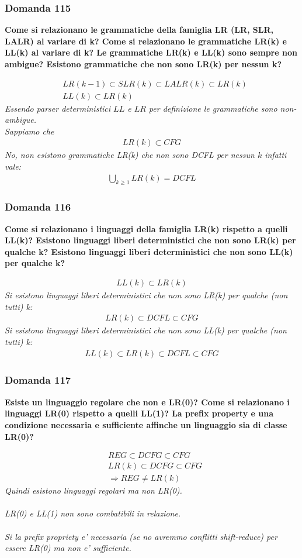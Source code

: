 \documentclass[12pt,a4paper,tikz,border=5pt]{article}
\newcommand{\domanda}[3]{%
  \subsubsection*{Domanda #1}
  \textbf{#2}
  \begin{mdframed}[backgroundcolor=grigiochiarissimo, linecolor=gray!50, linewidth=0.6pt, innertopmargin=6pt, innerbottommargin=12pt, innerleftmargin=8pt, innerrightmargin=8pt]
    \textit{#3}%
  \end{mdframed}%
  \vspace{0.4em}
}
\begin{document}
\domanda{115}{Come si relazionano le grammatiche della famiglia LR (LR, SLR, LALR) al variare di k? Come si relazionano le grammatiche LR(k) e LL(k) al variare di k? Le grammatiche LR(k) e LL(k) sono sempre non ambigue? Esistono grammatiche che non sono LR(k) per nessun k?}{
  \begin{align*}
    &LR(k-1) \subset SLR(k) \subset LALR(k) \subset LR(k)\\
    &LL(k) \subset LR(k)
  \end{align*}
  Essendo parser deterministici $LL$ e $LR$ per definizione le grammatiche sono non-ambigue.\\
  Sappiamo che 
  \begin{align*}
    LR(k) \subset CFG
  \end{align*}
  No, non esistono grammatiche LR(k) che non sono DCFL per nessun $k$ infatti vale:
  \begin{align*}
    \bigcup_{k \geq 1} LR(k) = DCFL
  \end{align*}
}

\domanda{116}{Come si relazionano i linguaggi della famiglia LR(k) rispetto a quelli LL(k)? Esistono linguaggi liberi deterministici che non sono LR(k) per qualche k? Esistono linguaggi liberi deterministici che non sono LL(k) per qualche k?}{
  \begin{align*}
    LL(k) \subset LR(k)
  \end{align*}
  Si esistono linguaggi liberi deterministici che non sono LR(k) per qualche (non tutti) k:
  \begin{align*}
    LR(k) \subset DCFL \subset CFG
  \end{align*}
  Si esistono linguaggi liberi deterministici che non sono LL(k) per qualche (non tutti) k:
\begin{align*}
      LL(k) \subset LR(k) \subset DCFL \subset CFG
\end{align*}
  }

\domanda{117}{Esiste un linguaggio regolare che non e LR(0)? Come si relazionano i linguaggi LR(0) rispetto a quelli LL(1)? La prefix property e una condizione necessaria e sufficiente affinche un linguaggio sia di classe LR(0)?}{
  \begin{align*}
    &REG \subset DCFG \subset CFG\\
    &LR(k) \subset DCFG \subset CFG\\
    & \Rightarrow REG \neq LR(k)
  \end{align*}
  Quindi esistono linguaggi regolari ma non LR(0).\\
  \vspace{1px}\\
  LR(0) e LL(1) non sono combatibili in relazione.\\
  \vspace{1px}\\
  Si la prefix propriety e' necessaria (se no avremmo conflitti shift-reduce) per essere LR(0) ma non e' sufficiente.
}
\end{document}
